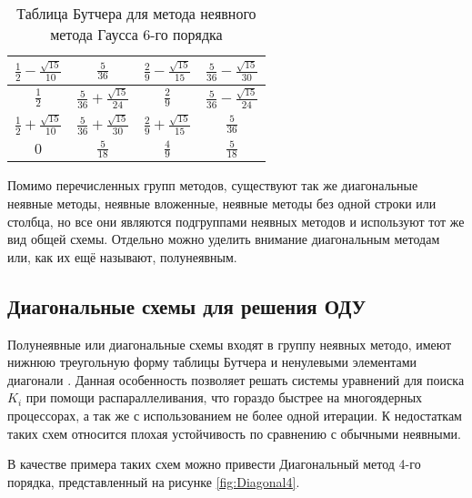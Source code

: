 \begin{table}    
    \caption{Таблица Бутчера для метода неявного метода Гаусса 6-го порядка}
    \begin{tabular}{|c|c|c|c|}
    \hline
    $\frac{1}{2} - \frac{\sqrt{15}}{10}$ & $\frac{5}{36}$ & $\frac{2}{9} - \frac{\sqrt{15}}{15}$ & $\frac{5}{36} - \frac{\sqrt{15}}{30}$\\
    \hline
    $\frac{1}{2}$ & $\frac{5}{36} + \frac{\sqrt{15}}{24}$ & $\frac{2}{9}$ & $\frac{5}{36} - \frac{\sqrt{15}}{24}$\\
    \hline
    $\frac{1}{2} + \frac{\sqrt{15}}{10}$ & $\frac{5}{36} + \frac{\sqrt{15}}{30}$ & $\frac{2}{9} + \frac{\sqrt{15}}{15}$ & $\frac{5}{36}$\\
    \hline
    $0$ & \cellcolor{lightgray} $\frac{5}{18}$ & \cellcolor{lightgray} $\frac{4}{9}$ & \cellcolor{lightgray} $\frac{5}{18}$\\
    \hline
    \end{tabular}
    \label{tab:Gauss6}
\end{table}

Помимо перечисленных групп методов, существуют так же диагональные неявные методы, неявные вложенные, неявные методы без одной строки
или столбца, но все они являются подгруппами неявных методов и используют тот же вид общей схемы. Отдельно можно уделить внимание
диагональным методам или, как их ещё называют, полунеявным.

\subsection{Диагональные схемы для решения ОДУ}

Полунеявные или диагональные схемы входят в группу неявных методо, имеют нижнюю треугольную форму таблицы Бутчера и ненулевыми
элементами диагонали \cite{Article1, Article6, cite_1_3}. Данная особенность позволяет решать системы уравнений для поиска $K_i$ при помощи распараллеливания, что гораздо
быстрее на многоядерных процессорах, а так же с использованием не более одной итерации. К недостаткам таких схем относится плохая
устойчивость по сравнению с обычными неявными.

В качестве примера таких схем можно привести Диагональный метод 4-го порядка, представленный на рисунке \ref{fig:Diagonal4}.

